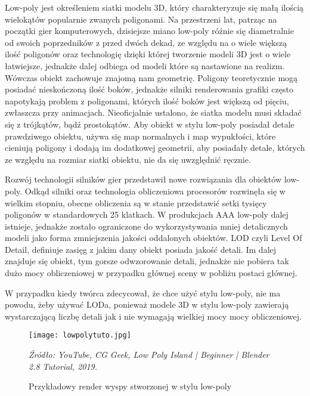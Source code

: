 \indent Low-poly jest określeniem siatki modelu 3D, który charakteryzuje się małą ilością wielokątów popularnie zwanych poligonami. Na przestrzeni lat, patrząc na początki gier komputerowych, dzisiejsze miano low-poly róźnie się diametralnie od swoich poprzedników z przed dwóch dekad, ze względu na o wiele większą ilość poligonów oraz technologię dzięki której tworzenie modeli 3D jest o wiele łatwiejsze, jednakże dalej odbiega od modeli które są nastawione na realizm. Wówczas obiekt zachowuje znajomą nam geometrię. Poligony teoretycznie mogą posiadać nieskończoną ilość boków, jednakże silniki renderowania grafiki często napotykają problem z poligonami, których ilość boków jest większą od pięciu, zwłaszcza przy animacjach. Nieoficjalnie ustalono, że siatka modelu musi składać się z trójkątów, bądź prostokątów. Aby obiekt w stylu low-poly posiadał detale prawdziwego obiektu, używa się map normalnych i map wypukłości, które cieniują poligony i dodają im dodatkowej geometrii, aby posiadały detale, których ze względu na rozmiar siatki obiektu, nie da się uwzględnić ręcznie. 

\indent Rozwój technologii silników gier przedstawił nowe rozwiązania dla obiektów low-poly. Odkąd silniki oraz technologia obliczeniowa procesorów rozwinęła się w wielkim stopniu, obecne obliczenia są w stanie przedstawić setki tysięcy poligonów w standardowych 25 klatkach. W produkcjach AAA low-poly  dalej istnieje, jednakże zostało ograniczone do wykorzystywania mniej detalicznych modeli jako forma zmniejszenia jakości oddalonych obiektów. LOD czyli Level Of Detail, definiuje zasięg z jakim dany obiekt posiada jakość detali. Im dalej znajduje się obiekt, tym gorsze odwzorowanie detali, jednakże nie pobiera tak dużo mocy obliczeniowej w przypadku głównej sceny w pobliżu postaci głównej. \cite{1}

\indent W przypadku kiedy twórca zdecycował, że chce użyć stylu low-poly, nie ma powodu, żeby używać LODa, ponieważ modele 3D w stylu low-poly zawierają wystarczającą liczbę detali jak i nie wymagają wielkiej mocy mocy obliczeniowej.



\begin{figure}[hbt!]
\centering
  \texttt{[image: lowpolytuto.jpg]}
  \caption{Przykładowy render wyspy stworzonej w stylu low-poly}\label{rys_1}
  \begin{minipage}[t]{0.75\linewidth}
    \emph{Źródło: YouTube, CG Geek, Low Poly Island | Beginner | Blender 2.8 Tutorial, 2019.}
  \end{minipage}
\end{figure}

